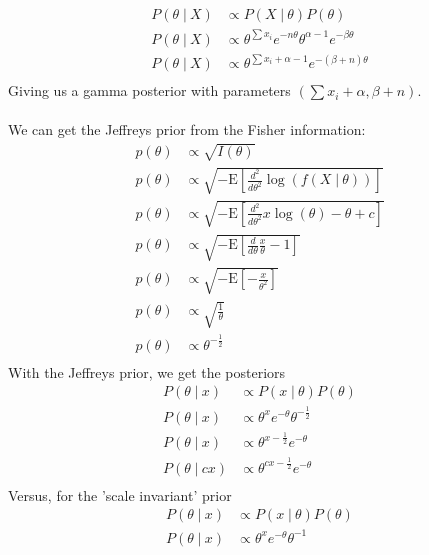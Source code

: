 \documentclass[11pt]{article}
\newcommand{\E}{\mathrm{E}}
\newcommand{\st}{ \; \big | \:}
\theoremstyle{definition}
\begin{document}
\begin{itemize}
\begin{align*}
            P(\theta \st X) &\propto P(X \st \theta)P(\theta) \\
            P(\theta \st X) &\propto \theta^{\sum x_i} e^{-n\theta}\theta^{\alpha-1} e^{-\beta\theta} \\
            P(\theta \st X) &\propto \theta^{\sum x_i+\alpha-1} e^{-(\beta+n)\theta}\\
        \end{align*}
        Giving us a gamma posterior with parameters \((\sum x_i+\alpha,\beta+n)\). \\
        \vspace{5mm} \\
        We can get the Jeffreys prior from the Fisher information:
        \begin{align*}
            p(\theta) &\propto \sqrt{I(\theta)} \\
            p(\theta) &\propto \sqrt{-\E\left[\frac{d^2}{d\theta^2} \log(f(X\st \theta))\right]} \\
            p(\theta) &\propto \sqrt{-\E\left[\frac{d^2}{d\theta^2} x\log(\theta)-\theta+c\right]} \\
            p(\theta) &\propto \sqrt{-\E\left[\frac{d}{d\theta} \frac{x}{\theta}-1\right]} \\
            p(\theta) &\propto \sqrt{-\E\left[-\frac{x}{\theta^2}\right]} \\
            p(\theta) &\propto \sqrt{\frac{1}{\theta}} \\
            p(\theta) &\propto \theta^{-\frac{1}{2}} \\
        \end{align*}
        With the Jeffreys prior, we get the posteriors
        \begin{align*}
            P(\theta \st x) &\propto P(x \st \theta)P(\theta) \\
            P(\theta \st x) &\propto \theta^{x} e^{-\theta}\theta^{-\frac{1}{2}} \\
            P(\theta \st x) &\propto \theta^{x-\frac{1}{2}} e^{-\theta} \\
            P(\theta \st cx) &\propto \theta^{cx-\frac{1}{2}} e^{-\theta} \\
        \end{align*}
        Versus, for the 'scale invariant' prior
        \begin{align*}
            P(\theta \st x) &\propto P(x \st \theta)P(\theta) \\
            P(\theta \st x) &\propto \theta^{x} e^{-\theta}\theta^{-1} \\

\end{align*}
\end{itemize}
\end{document}
